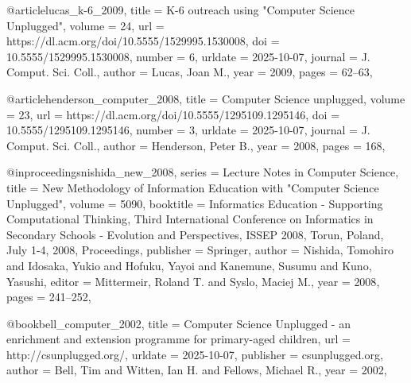 @article{lucas_k-6_2009,
	title = {K-6 outreach using "{Computer} {Science} {Unplugged}"},
	volume = {24},
	url = {https://dl.acm.org/doi/10.5555/1529995.1530008},
	doi = {10.5555/1529995.1530008},
	number = {6},
	urldate = {2025-10-07},
	journal = {J. Comput. Sci. Coll.},
	author = {Lucas, Joan M.},
	year = {2009},
	pages = {62--63},
}

@article{henderson_computer_2008,
	title = {Computer {Science} unplugged},
	volume = {23},
	url = {https://dl.acm.org/doi/10.5555/1295109.1295146},
	doi = {10.5555/1295109.1295146},
	number = {3},
	urldate = {2025-10-07},
	journal = {J. Comput. Sci. Coll.},
	author = {Henderson, Peter B.},
	year = {2008},
	pages = {168},
}

@inproceedings{nishida_new_2008,
	series = {Lecture Notes in Computer Science},
	title = {New Methodology of Information Education with "Computer Science Unplugged"},
	volume = {5090},
	booktitle = {Informatics {Education} - {Supporting} {Computational} {Thinking}, {Third} {International} {Conference} on 
{Informatics} in {Secondary} {Schools} - {Evolution} and {Perspectives}, {ISSEP} 2008, {Torun}, {Poland}, {July} 1-4, 2008, 
{Proceedings}},
	publisher = {Springer},
	author = {Nishida, Tomohiro and Idosaka, Yukio and Hofuku, Yayoi and Kanemune, Susumu and Kuno, Yasushi},
	editor = {Mittermeir, Roland T. and Syslo, Maciej M.},
	year = {2008},
	pages = {241--252},
}

@book{bell_computer_2002,
	title = {Computer {Science} {Unplugged} - an enrichment and extension programme for primary-aged children},
	url = {http://csunplugged.org/},
	urldate = {2025-10-07},
	publisher = {csunplugged.org},
	author = {Bell, Tim and Witten, Ian H. and Fellows, Michael R.},
	year = {2002},
}

